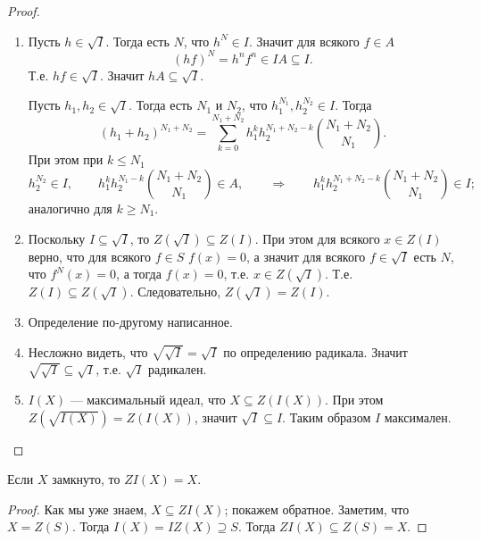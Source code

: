 \documentclass[12pt,a4paper]{article}
\begin{document}
    \begin{proof}
        \begin{enumerate}
            \item Пусть $h \in \sqrt{I}$. Тогда есть $N$, что $h^N \in I$. Значит для всякого $f \in A$
                \[(hf)^N = h^n f^n \in I A \subseteq I.\]
                Т.е. $hf \in \sqrt{I}$. Значит $hA \subseteq \sqrt{I}$.
        
                Пусть $h_1, h_2 \in \sqrt{I}$. Тогда есть $N_1$ и $N_2$, что $h_1^{N_1}, h_2^{N_2} \in I$. Тогда
                \[(h_1 + h_2)^{N_1 + N_2} = \sum_{k=0}^{N_1 + N_2} h_1^k h_2^{N_1 + N_2 - k} \binom{N_1 + N_2}{N_1}.\]
                При этом при $k \leqslant N_1$
                \[
                    h_2^{N_2} \in I,
                    \qquad
                    h_1^k h_2^{N_1 - k} \binom{N_1 + N_2}{N_1} \in A,
                    \qquad \Longrightarrow \qquad
                    h_1^k h_2^{N_1 + N_2 - k} \binom{N_1 + N_2}{N_1} \in I;
                \]
                аналогично для $k \geqslant N_1$.

            \item Поскольку $I \subseteq \sqrt{I}$, то $Z(\sqrt{I}) \subseteq Z(I)$. При этом для всякого $x \in Z(I)$ верно, что для всякого $f \in S$ $f(x) = 0$, а значит для всякого $f \in \sqrt{I}$ есть $N$, что $f^N(x) = 0$, а тогда $f(x) = 0$, т.е. $x \in Z(\sqrt{I})$. Т.е. $Z(I) \subseteq Z(\sqrt{I})$. Следовательно, $Z(\sqrt{I}) = Z(I)$.

            \item Определение по-другому написанное.
            
            \item Несложно видеть, что $\sqrt{\sqrt{I}} = \sqrt{I}$ по определению радикала. Значит $\sqrt{\sqrt{I}} \subseteq \sqrt{I}$, т.е. $\sqrt{I}$ радикален.
            
            \item $I(X)$ --- максимальный идеал, что $X \subseteq Z(I(X))$. При этом $Z(\sqrt{I(X)}) = Z(I(X))$, значит $\sqrt{I} \subseteq I$. Таким образом $I$ максимален.
        \end{enumerate}
    \end{proof}

    \begin{lemma}
        Если $X$ замкнуто, то $ZI(X) = X$.
    \end{lemma}

    \begin{proof}
        Как мы уже знаем, $X \subseteq ZI(X)$; покажем обратное. Заметим, что $X = Z(S)$. Тогда $I(X) = IZ(X) \supseteq S$. Тогда $ZI(X) \subseteq Z(S) = X$.
    \end{proof}
\end{document}
